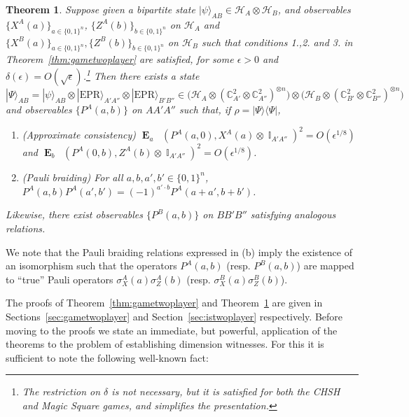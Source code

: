 \documentclass[11pt,letterpaper]{article}
\newcommand{\<}{\langle}
\renewcommand{\>}{\rangle}
\newtheorem{theorem}{Theorem}
\newcommand{\bra}[1]{\< #1 |}
\newcommand{\ket}[1]{| #1 \>}
\newcommand{\eps}{\epsilon}
\newcommand{\ot}{\otimes}
\newcommand{\mH}{\mathcal{H}}
\DeclareMathOperator{\E}{\mathbf{E}}
\DeclareMathOperator{\Id}{\mathbb{I}}
\DeclareMathOperator{\DIS}{d}
\DeclareMathOperator{\Drho}{\DIS_\rho}
\newcommand{\tnote}[1]{\textcolor{magenta}{\small {\textbf{(Thomas:}
      #1\textbf{) }}}}
\newcommand{\anote}[1]{\textcolor{red}{\small {\textbf{(Anand:} #1\textbf{) }}}}
\newcommand{\tnote}[1]{{}}
\newcommand{\anote}[1]{{}}
\newcommand{\C}{\mathbb{C}}
\newcommand{\EPR}{\mathrm{EPR}}
\newcommand{\proj}[1]{\ket{#1}\bra{#1}}
\begin{document}
\begin{theorem}
\label{thm:isotwoplayer}
Suppose given a bipartite state $\ket{\psi}_{AB}\in\mH_A\otimes\mH_B$, and
observables $\{X^A(a)\}_{a\in\{0,1\}^n}$, $\{Z^A(b)\}_{b\in\{0,1\}^n}$ on $\mH_A$ and
$\{X^B(a)\}_{a\in\{0,1\}^n}, \{Z^B(b)\}_{b\in\{0,1\}^n}$ on $\mH_B$ such that conditions 1.,2. and 3. in Theorem~\ref{thm:gametwoplayer} are satisfied, for some $\eps>0$ and $\delta(\eps)=O(\sqrt{\eps})$.\footnote{The restriction on $\delta$ is not necessary, but it is satisfied for both the CHSH and Magic Square games, and simplifies the presentation.} 
Then there exists a state 
$$\ket{\Psi}_{AB} = \ket{\psi}_{AB} \ot \ket{\EPR}_{A'A''} \ot \ket{\EPR}_{B'B''}\in \big(\mH_A \otimes (\C^2_{A'}\otimes \C^2_{A''})^{\otimes n} \big) \otimes \big(\mH_B \otimes (\C^2_{B'}\otimes \C^2_{B''})^{\otimes n} \big)$$
 and
 observables $\{P^A(a,b)\}$ on $AA'A''$ such that, if $\rho=\proj{\Psi}$, 
\begin{enumerate}
  \item[(a)] (Approximate consistency) $\E_a \Drho(P^A(a,0), X^A(a) \otimes
    \Id_{A'A''})^2 = O(\eps^{1/8})$ and $\E_b
    \Drho(P^A(0,b), Z^A(b) \otimes \Id_{A'A'' })^2 = O(\eps^{1/8})$.
  \item[(b)] (Pauli braiding) For all $a,b,a',b'\in\{0,1\}^n$, $P^A(a,b) P^A(a', b')= (-1)^{a' \cdot b}
    P^A(a+a', b+b') $.
\end{enumerate}
Likewise, there exist observables $\{P^B(a,b)\}$ on $BB'B''$ satisfying analogous relations.
\end{theorem}

We note that the Pauli braiding relations expressed in (b) imply the existence
of an isomorphism such that the operators $P^A(a,b)$ (resp. $P^B(a,b)$) are
mapped to ``true'' Pauli operators $\sigma_X^A(a) \sigma_Z^A(b)$
(resp. $\sigma_X^B(a) \sigma_Z^B(b)$). 

The proofs of Theorem~\ref{thm:gametwoplayer} and Theorem~\ref{thm:isotwoplayer} are given in Sections~\ref{sec:gametwoplayer} and Section~\ref{sec:istwoplayer} respectively. Before moving to the proofs we state an immediate, but powerful, application of the theorems to the problem of establishing dimension witnesses. For this it is sufficient to note the following well-known fact:
\end{document}
